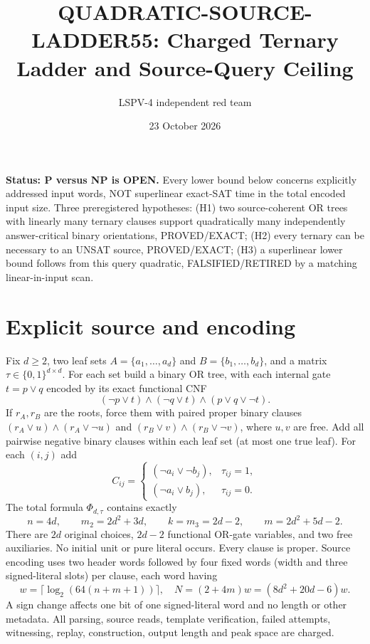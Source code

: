 \documentclass[11pt]{article}
\title{QUADRATIC-SOURCE-LADDER55: Charged Ternary Ladder and Source-Query Ceiling}
\author{LSPV-4 independent red team}
\date{23 October 2026}
\begin{document}
\maketitle
\noindent\textbf{Status: P versus NP is OPEN.} Every lower bound below concerns explicitly addressed input words, NOT superlinear exact-SAT time in the total encoded input size. Three preregistered hypotheses: (H1) two source-coherent OR trees with linearly many ternary clauses support quadratically many independently answer-critical binary orientations, PROVED/EXACT; (H2) every ternary can be necessary to an UNSAT source, PROVED/EXACT; (H3) a superlinear lower bound follows from this query quadratic, FALSIFIED/RETIRED by a matching linear-in-input scan.

\section{Explicit source and encoding}
Fix $d\ge2$, two leaf sets $A=\{a_1,\ldots,a_d\}$ and $B=\{b_1,\ldots,b_d\}$, and a matrix $\tau\in\{0,1\}^{d\times d}$. For each set build a binary OR tree, with each internal gate $t=p\lor q$ encoded by its exact functional CNF
\[
(\neg p\lor t)\land(\neg q\lor t)\land(p\lor q\lor\neg t).
\]
If $r_A,r_B$ are the roots, force them with paired proper binary clauses $(r_A\lor u)\land(r_A\lor\neg u)$ and $(r_B\lor v)\land(r_B\lor\neg v)$, where $u,v$ are free. Add all pairwise negative binary clauses within each leaf set (at most one true leaf). For each $(i,j)$ add
\[
C_{ij}=\begin{cases}(\neg a_i\lor\neg b_j),&\tau_{ij}=1,\\
(\neg a_i\lor b_j),&\tau_{ij}=0.\end{cases}
\]
The total formula $\Phi_{d,\tau}$ contains exactly
\[
n=4d,\qquad m_2=2d^2+3d,\qquad k=m_3=2d-2,\qquad m=2d^2+5d-2.
\]
There are $2d$ original choices, $2d-2$ functional OR-gate variables, and two free auxiliaries. No initial unit or pure literal occurs. Every clause is proper. Source encoding uses two header words followed by four fixed words (width and three signed-literal slots) per clause, each word having
\[
w=\lceil\log_2(64(n+m+1))\rceil,\quad N=(2+4m)w=(8d^2+20d-6)w.
\]
A sign change affects one bit of one signed-literal word and no length or other metadata. All parsing, source reads, template verification, failed attempts, witnessing, replay, construction, output length and peak space are charged.
\end{document}
